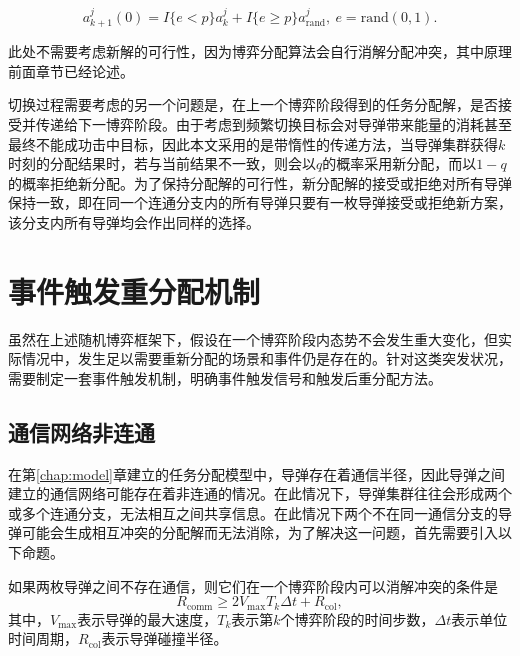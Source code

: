 \begin{equation}
\label{sg:eq:crossfactor}
	a_{k+1}^j(0) = I\{e<p\}a_k^j + I\{e \geq p\}a_{\text{rand}}^j,\ e = \mathrm{rand}(0,1).
\end{equation}

此处不需要考虑新解的可行性，因为博弈分配算法会自行消解分配冲突，其中原理前面章节已经论述。

切换过程需要考虑的另一个问题是，在上一个博弈阶段得到的任务分配解，是否接受并传递给下一博弈阶段。由于考虑到频繁切换目标会对导弹带来能量的消耗甚至最终不能成功击中目标，因此本文采用的是带惰性的传递方法，当导弹集群获得$k$时刻的分配结果时，若与当前结果不一致，则会以$q$的概率采用新分配，而以$1-q$的概率拒绝新分配。为了保持分配解的可行性，新分配解的接受或拒绝对所有导弹保持一致，即在同一个连通分支内的所有导弹只要有一枚导弹接受或拒绝新方案，该分支内所有导弹均会作出同样的选择。




\section{事件触发重分配机制}
\label{sg:special_incidence}

虽然在上述随机博弈框架下，假设在一个博弈阶段内态势不会发生重大变化，但实际情况中，发生足以需要重新分配的场景和事件仍是存在的。针对这类突发状况，需要制定一套事件触发机制，明确事件触发信号和触发后重分配方法。

\subsection{通信网络非连通}
\label{special:disconnected_network}

在第\ref{chap:model}章建立的任务分配模型中，导弹存在着通信半径，因此导弹之间建立的通信网络可能存在着非连通的情况。在此情况下，导弹集群往往会形成两个或多个连通分支，无法相互之间共享信息。在此情况下两个不在同一通信分支的导弹可能会生成相互冲突的分配解而无法消除，为了解决这一问题，首先需要引入以下命题。

\begin{proposition}[可消解冲突]
	如果两枚导弹之间不存在通信，则它们在一个博弈阶段内可以消解冲突的条件是
	\begin{equation}
	\label{sg:eq:collision}
		R_{\text{comm}} \geq 2 V_{\text{max}} T_k \Delta t + R_{\text{col}},
	\end{equation}
	其中，$V_{\text{max}}$表示导弹的最大速度，$T_k$表示第$k$个博弈阶段的时间步数，$\Delta t$表示单位时间周期，$R_{\text{col}}$表示导弹碰撞半径。
\end{proposition}

